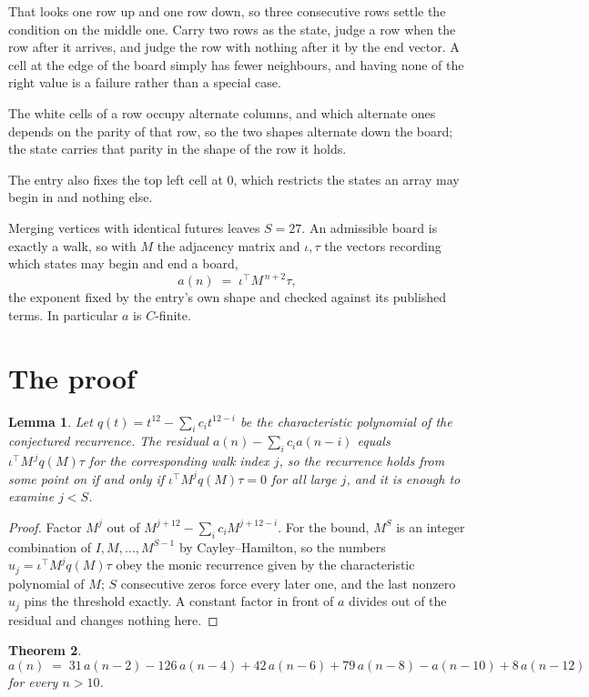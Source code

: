 \documentclass[11pt,a4paper]{article}
\theoremstyle{plain}
\newtheorem{theorem}{Theorem}
\newtheorem{lemma}[theorem]{Lemma}
\theoremstyle{definition}
\begin{document}
That looks one row up and one row down, so three consecutive rows settle the condition on the middle one. Carry two rows as the state, judge a row when the row after it arrives, and judge the row with nothing after it by the end vector. A cell at the edge of the board simply has fewer neighbours, and having none of the right value is a failure rather than a special case.

The white cells of a row occupy alternate columns, and which alternate ones depends on the parity of that row, so the two shapes alternate down the board; the state carries that parity in the shape of the row it holds.

The entry also fixes the top left cell at $0$, which restricts the states an array may begin in and nothing else.

Merging vertices with identical futures leaves $S=27$. An admissible board is exactly a walk, so with $M$ the adjacency matrix and $\iota,\tau$ the vectors recording which states may begin and end a board,
\[
a(n)\;=\;\iota^{\!\top}M^{\,n+2}\tau ,
\]
the exponent fixed by the entry's own shape and checked against its published terms. In
particular $a$ is $C$-finite.

\section{The proof}

\begin{lemma}\label{lem:crit}
Let $q(t)=t^{12}-\sum_i c_it^{12-i}$ be the characteristic polynomial of the
conjectured recurrence. The residual $a(n)-\sum_ic_ia(n-i)$ equals
$\iota^{\!\top}M^{\,j}q(M)\tau$ for the corresponding walk index $j$, so the recurrence
holds from some point on if and only if $\iota^{\!\top}M^{j}q(M)\tau=0$ for all large $j$,
and it is enough to examine $j<S$.
\end{lemma}

\begin{proof}
Factor $M^{j}$ out of $M^{j+12}-\sum_ic_iM^{j+12-i}$. For the bound, $M^{S}$
is an integer combination of $I,M,\dots,M^{S-1}$ by Cayley--Hamilton, so the numbers
$u_j=\iota^{\!\top}M^{j}q(M)\tau$ obey the monic recurrence given by the characteristic
polynomial of $M$; $S$ consecutive zeros force every later one, and the last nonzero $u_j$
pins the threshold exactly. A constant factor in front of $a$ divides out of the residual and
changes nothing here.
\end{proof}

\begin{theorem}
\[
a(n)\;=\;31\,a(n-2) - 126\,a(n-4) + 42\,a(n-6) + 79\,a(n-8) - a(n-10) + 8\,a(n-12)
\]
for every $n>10$.
\end{theorem}
\end{document}
